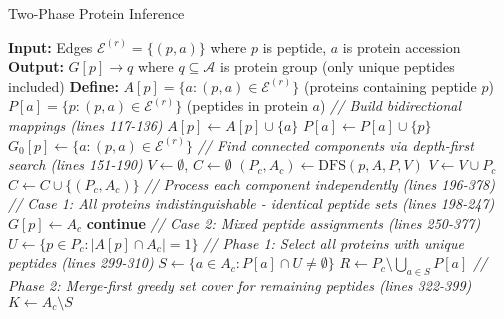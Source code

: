 \documentclass{article}
\begin{document}
\begin{algorithm}[H]
\caption{Two-Phase Protein Inference}
\begin{algorithmic}[1]
\State \textbf{Input:} Edges $\mathcal{E}^{(r)} = \{(p, a)\}$ where $p$ is peptide, $a$ is protein accession
\State \textbf{Output:} $G[p] \to q$ where $q \subseteq \mathcal{A}$ is protein group (only unique peptides included)
\State \textbf{Define:} $A[p] = \{a : (p, a) \in \mathcal{E}^{(r)}\}$ (proteins containing peptide $p$)
\State \hspace{2.3em} $P[a] = \{p : (p, a) \in \mathcal{E}^{(r)}\}$ (peptides in protein $a$)
\State
\State \textit{// Build bidirectional mappings (lines 117-136)}
    \State $A[p] \gets A[p] \cup \{a\}$ 
    \State $P[a] \gets P[a] \cup \{p\}$ 
    \State $G_0[p] \gets \{a : (p, a) \in \mathcal{E}^{(r)}\}$ 
\EndFor
\State
\State \textit{// Find connected components via depth-first search (lines 151-190)}
\State $V \gets \emptyset$, $C \gets \emptyset$ 
        \State $(P_c, A_c) \gets \text{DFS}(p, A, P, V)$ 
        \State $V \gets V \cup P_c$ 
        \State $C \gets C \cup \{(P_c, A_c)\}$
    \EndIf
\EndFor
\State
\State \textit{// Process each component independently (lines 196-378)}
    \State
    \State \textit{// Case 1: All proteins indistinguishable - identical peptide sets (lines 198-247)}
            \State $G[p] \gets A_c$ 
        \EndFor
        \State \textbf{continue}
    \EndIf
    \State
    \State \textit{// Case 2: Mixed peptide assignments (lines 250-377)}
    \State $U \gets \{p \in P_c : |A[p] \cap A_c| = 1\}$ 
    \State
    \State \textit{// Phase 1: Select all proteins with unique peptides (lines 299-310)}
    \State $S \gets \{a \in A_c : P[a] \cap U \neq \emptyset\}$ 
    \State $R \gets P_c \setminus \bigcup_{a \in S} P[a]$ 
    \State
    \State \textit{// Phase 2: Merge-first greedy set cover for remaining peptides (lines 322-399)}
    \State $K \gets A_c \setminus S$ 

\end{algorithmic}
\end{algorithm}
\end{document}
